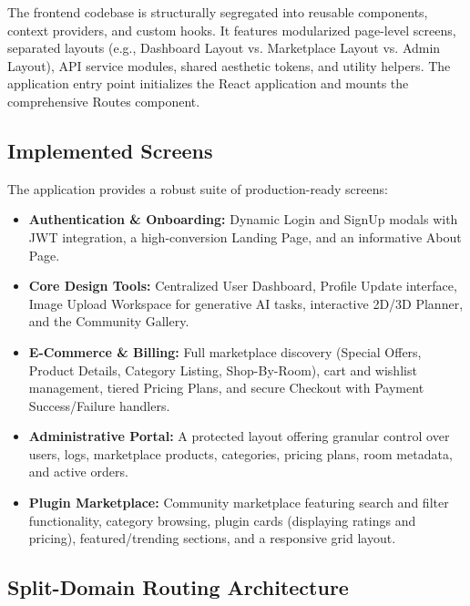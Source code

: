 The frontend codebase is structurally segregated into reusable components, context providers, and custom hooks. It features modularized page-level screens, separated layouts (e.g., Dashboard Layout vs. Marketplace Layout vs. Admin Layout), API service modules, shared aesthetic tokens, and utility helpers. The application entry point initializes the React application and mounts the comprehensive Routes component.

\subsection{Implemented Screens}

The application provides a robust suite of production-ready screens:

\begin{itemize}
    \item \textbf{Authentication \& Onboarding:} Dynamic Login and SignUp modals with JWT integration, a high-conversion Landing Page, and an informative About Page.
    \item \textbf{Core Design Tools:} Centralized User Dashboard, Profile Update interface, Image Upload Workspace for generative AI tasks, interactive 2D/3D Planner, and the Community Gallery.
    \item \textbf{E-Commerce \& Billing:} Full marketplace discovery (Special Offers, Product Details, Category Listing, Shop-By-Room), cart and wishlist management, tiered Pricing Plans, and secure Checkout with Payment Success/Failure handlers.
    \item \textbf{Administrative Portal:} A protected layout offering granular control over users, logs, marketplace products, categories, pricing plans, room metadata, and active orders.
    \item \textbf{Plugin Marketplace:} Community marketplace featuring search and filter functionality, category browsing, plugin cards (displaying ratings and pricing), featured/trending sections, and a responsive grid layout.
\end{itemize}

\subsection{Split-Domain Routing Architecture}
\label{subsec:split_domain_routing}


